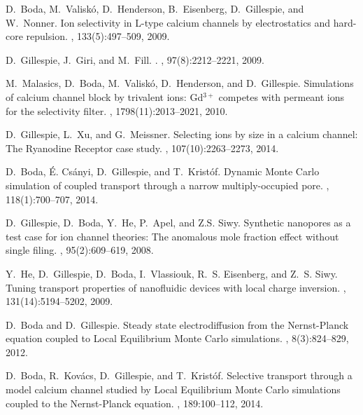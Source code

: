 \documentclass[fleqn,10pt]{SelfArx} %
\begin{document}
\begin{thebibliography}{10}
D.~Boda, M.~Valisk{\'o}, D.~Henderson, B.~Eisenberg, D.~Gillespie, and
  W.~Nonner.
\newblock Ion selectivity in {L-type} calcium channels by electrostatics and
  hard-core repulsion.
, 133(5):497--509, 2009.

D.~Gillespie, J.~Giri, and M.~Fill.
.
, 97(8):2212--2221, 2009.

M.~Malasics, D.~Boda, M.~Valisk{\'o}, D.~Henderson, and D.~Gillespie.
\newblock Simulations of calcium channel block by trivalent ions: {Gd$^{3+}$}
  competes with permeant ions for the selectivity filter.
, 1798(11):2013--2021,
  2010.

D.~Gillespie, L.~Xu, and G.~Meissner.
\newblock Selecting ions by size in a calcium channel: {The} {Ryanodine
  Receptor} case study.
, 107(10):2263--2273, 2014.

D.~Boda, \'E. Cs\'anyi, D.~Gillespie, and T.~Krist\'of.
\newblock Dynamic {Monte Carlo} simulation of coupled transport through a
  narrow multiply-occupied pore.
, 118(1):700--707, 2014.

D.~Gillespie, D.~Boda, Y.~He, P.~Apel, and Z.S. Siwy.
\newblock Synthetic nanopores as a test case for ion channel theories: {The}
  anomalous mole fraction effect without single filing.
, 95(2):609--619, 2008.

Y.~He, D.~Gillespie, D.~Boda, I.~Vlassiouk, R.~S. Eisenberg, and Z.~S. Siwy.
\newblock Tuning transport properties of nanofluidic devices with local charge
  inversion.
, 131(14):5194--5202, 2009.

D.~Boda and D.~Gillespie.
\newblock Steady state electrodiffusion from the {Nernst-Planck} equation
  coupled to {Local Equilibrium Monte Carlo} simulations.
, 8(3):824--829, 2012.

D.~Boda, R.~Kov\'acs, D.~Gillespie, and T.~Krist\'of.
\newblock Selective transport through a model calcium channel studied by
  {Local} {Equilibrium} {Monte} {Carlo} simulations coupled to the
  {Nernst}-{Planck} equation.
, 189:100--112, 2014.


\end{thebibliography}
\end{document}
